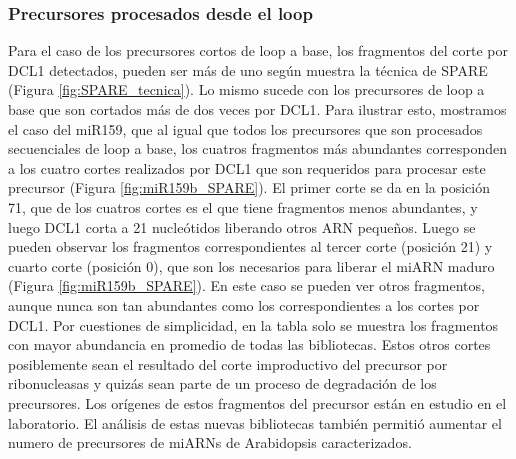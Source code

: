\subsubsection{Precursores procesados desde el loop}

Para el caso de los precursores cortos de loop a base, los fragmentos del corte por DCL1 detectados, pueden ser más de uno según muestra la técnica de SPARE (Figura \ref{fig:SPARE_tecnica}).
Lo mismo sucede con los precursores de loop a base que son cortados más de dos veces por DCL1.
Para ilustrar esto, mostramos  el caso del miR159, que al igual que todos los precursores que son procesados secuenciales de loop a base, los cuatros fragmentos más abundantes corresponden a los cuatro cortes realizados por DCL1 que son requeridos para procesar este precursor (Figura \ref{fig:miR159b_SPARE}).
El primer corte se da en la posición 71, que de los cuatros cortes es el que tiene fragmentos menos abundantes, y luego DCL1 corta a 21 nucleótidos liberando otros ARN pequeños.
Luego se pueden observar los fragmentos correspondientes al tercer corte (posición 21) y cuarto corte (posición 0), que son los necesarios para liberar el miARN maduro (Figura \ref{fig:miR159b_SPARE}).
En este caso se pueden ver otros fragmentos, aunque nunca son tan abundantes como los correspondientes a los cortes por DCL1.
Por cuestiones de simplicidad, en la tabla solo se muestra los fragmentos con mayor abundancia en promedio de todas las bibliotecas.
Estos otros cortes posiblemente sean el resultado del corte improductivo del precursor por ribonucleasas y quizás sean parte de un proceso de degradación de los precursores.
Los orígenes de estos fragmentos del precursor están en estudio en el laboratorio.
El análisis de estas nuevas bibliotecas también permitió aumentar el numero de precursores de miARNs de Arabidopsis caracterizados.


